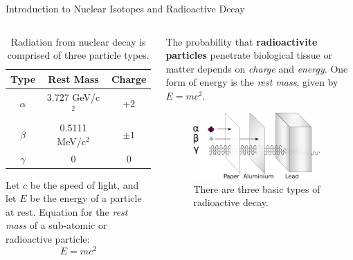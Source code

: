 \documentclass{beamer}
\begin{document}
\begin{frame}{Introduction to Nuclear Isotopes and Radioactive Decay}
\small
\begin{columns}[T]
\begin{column}{0.5\textwidth}
\begin{table}
\centering
\begin{tabular}{| c | c | c |}
\hline
Type & Rest Mass & Charge \\ \hline
$\alpha$ & 3.727 GeV/c$^2$ & +2 \\ \hline
$\beta$ & 0.5111 MeV/c$^2$ & $\pm 1$ \\ \hline
$\gamma$ & 0 & 0 \\ \hline
\end{tabular}
\caption{\label{tab:radio} Radiation from nuclear decay is comprised of three particle types.}
\end{table}
Let $c$ be the speed of light, and let $E$ be the energy of a particle at rest.  Equation for the \textit{rest mass} of a sub-atomic or radioactive particle:
\begin{equation}
E = mc^2
\end{equation}
\end{column}
\begin{column}{0.5\textwidth}
The probability that \textbf{\alert{radioactivite particles}} penetrate biological tissue or matter depends on \textit{charge} and \textit{energy}.  One form of energy is the \textit{rest mass}, given by $E = mc^2$.
\begin{figure}
\centering
\includegraphics[width=0.95\textwidth]{figures/radioactivity.png}
\caption{\label{fig:radio2} There are three basic types of radioactive decay.}
\end{figure}
\end{column}
\end{columns}
\end{frame}
\end{document}
